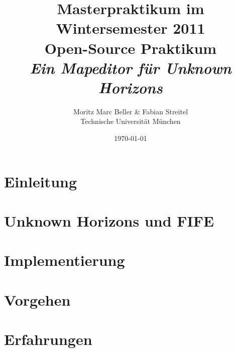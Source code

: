 \documentclass[german]{scrartcl}
\author{Moritz Marc Beller \& Fabian Streitel \\ Technische Universität München}
\title{Masterpraktikum im Wintersemester 2011 \\
Open-Source Praktikum \\
\textit{Ein Mapeditor für Unknown Horizons}}
\date{\today} %
\begin{document}
\maketitle{}

\section{Einleitung}


\section{Unknown Horizons und FIFE}


\section{Implementierung}


\section{Vorgehen}


\section{Erfahrungen}


\cite{test}

{}
\end{document}
